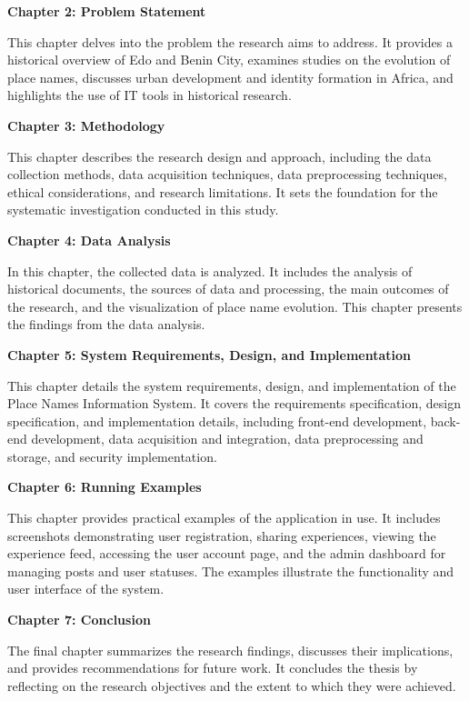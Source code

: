 \textbf{Chapter 2: Problem Statement}

This chapter delves into the problem the research aims to address. It provides a historical overview of Edo and Benin City, examines studies on the evolution of place names, discusses urban development and identity formation in Africa, and highlights the use of IT tools in historical research.

\textbf{Chapter 3: Methodology}

This chapter describes the research design and approach, including the data collection methods, data acquisition techniques, data preprocessing techniques, ethical considerations, and research limitations. It sets the foundation for the systematic investigation conducted in this study.

\textbf{Chapter 4: Data Analysis}

In this chapter, the collected data is analyzed. It includes the analysis of historical documents, the sources of data and processing, the main outcomes of the research, and the visualization of place name evolution. This chapter presents the findings from the data analysis.

\textbf{Chapter 5: System Requirements, Design, and Implementation}

This chapter details the system requirements, design, and implementation of the Place Names Information System. It covers the requirements specification, design specification, and implementation details, including front-end development, back-end development, data acquisition and integration, data preprocessing and storage, and security implementation.

\textbf{Chapter 6: Running Examples}

This chapter provides practical examples of the application in use. It includes screenshots demonstrating user registration, sharing experiences, viewing the experience feed, accessing the user account page, and the admin dashboard for managing posts and user statuses. The examples illustrate the functionality and user interface of the system.

\textbf{Chapter 7: Conclusion}

The final chapter summarizes the research findings, discusses their implications, and provides recommendations for future work. It concludes the thesis by reflecting on the research objectives and the extent to which they were achieved.
